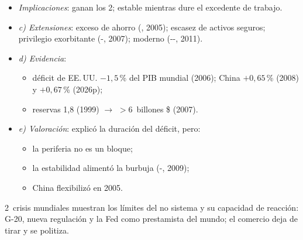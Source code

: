 \documentclass{article}
\begin{document}
\begin{columnas}
\begin{itemize}
\begin{itemize}
\begin{enumerate}
    \item IED del centro en la periferia, con las reservas como garantía.
    \end{enumerate}
  \item \emph{Implicaciones}: ganan los 2; estable mientras dure el excedente de trabajo.
  \end{itemize}
\end{itemize}
\begin{itemize}
\item \emph{c) Extensiones}: exceso de ahorro (, 2005); escasez de activos seguros; privilegio exorbitante (-, 2007);  moderno (--, 2011).
\item \emph{d) Evidencia}:
  \begin{itemize}
  \item déficit de EE.\,UU. $-1{,}5$\,\% del PIB mundial (2006); China $+0{,}65$\,\% (2008) y $+0{,}67$\,\% (2026p);
  \item reservas 1,8 (1999) $\to$ $>$6~billones \$ (2007).
  \end{itemize}
\item \emph{e) Valoración}: explicó la duración del déficit, pero:
  \begin{itemize}
  \item la periferia no es un bloque;
  \item la estabilidad alimentó la burbuja (-, 2009);
  \item China flexibilizó en 2005.
  \end{itemize}
\end{itemize}

\begin{ideaclave}
2~crisis mundiales muestran los límites del no sistema y su capacidad de reacción: G-20, nueva regulación y la Fed como prestamista del mundo; el comercio deja de tirar y se politiza.
\end{ideaclave}


\end{columnas}
\end{document}
